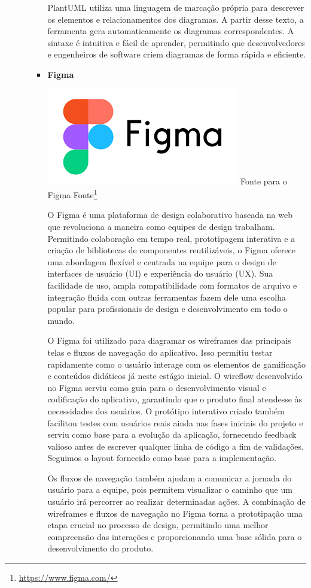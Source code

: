 \begin{itemize}
\begin{itemize}
\begin{itemize}
PlantUML utiliza uma linguagem de marcação própria para descrever os elementos e relacionamentos dos diagramas. A partir desse texto, a ferramenta gera automaticamente os diagramas correspondentes. A sintaxe é intuitiva e fácil de aprender, permitindo que desenvolvedores e engenheiros de software criem diagramas de forma rápida e eficiente.


    \item \textbf{Figma}
    \begin{center}
    \includegraphics[width=0.5\linewidth]{figuras/Tecnologies/Figma.png}
    \label{fig:Figma}
    Fonte para o Figma Fonte\footnote{\url{https://www.figma.com/}}
\end{center}

O Figma é uma plataforma de design colaborativo baseada na web que revoluciona a maneira como equipes de design trabalham. Permitindo colaboração em tempo real, prototipagem interativa e a criação de bibliotecas de componentes reutilizáveis, o Figma oferece uma abordagem flexível e centrada na equipe para o design de interfaces de usuário (UI) e experiência do usuário (UX). Sua facilidade de uso, ampla compatibilidade com formatos de arquivo e integração fluida com outras ferramentas fazem dele uma escolha popular para profissionais de design e desenvolvimento em todo o mundo.

O Figma foi utilizado para diagramar os wireframes das principais telas e fluxos de navegação do aplicativo. Isso permitiu testar rapidamente como o usuário interage com os elementos de gamificação e conteúdos didáticos já neste estágio inicial. O wireflow desenvolvido no Figma serviu como guia para o desenvolvimento visual e codificação do aplicativo, garantindo que o produto final atendesse às necessidades dos usuários. O protótipo interativo criado também facilitou testes com usuários reais ainda nas fases iniciais do projeto e serviu como base para a evolução da aplicação, fornecendo feedback valioso antes de escrever qualquer linha de código a fim de validações. Seguimos o layout fornecido como base para a implementação. 

Os fluxos de navegação também ajudam a comunicar a jornada do usuário para a equipe, pois permitem visualizar o caminho que um usuário irá percorrer ao realizar determinadas ações. A combinação de wireframes e fluxos de navegação no Figma torna a prototipação uma etapa crucial no processo de design, permitindo uma melhor compreensão das interações e proporcionando uma base sólida para o desenvolvimento do produto.
   

\end{itemize}
\end{itemize}
\end{itemize}

